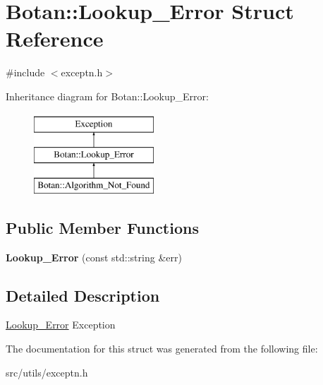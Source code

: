 \hypertarget{structBotan_1_1Lookup__Error}{\section{Botan\-:\-:Lookup\-\_\-\-Error Struct Reference}
\label{structBotan_1_1Lookup__Error}
}


{\ttfamily \#include $<$exceptn.\-h$>$}

Inheritance diagram for Botan\-:\-:Lookup\-\_\-\-Error\-:\begin{figure}[H]
\begin{center}
\leavevmode
\includegraphics[height=3.000000cm]{structBotan_1_1Lookup__Error}
\end{center}
\end{figure}
\subsection*{Public Member Functions}
\begin{DoxyCompactItemize}
\item 
\hypertarget{structBotan_1_1Lookup__Error_af5de9655a86c1592d6e06093e1749813}{{\bfseries Lookup\-\_\-\-Error} (const std\-::string \&err)}\label{structBotan_1_1Lookup__Error_af5de9655a86c1592d6e06093e1749813}

\end{DoxyCompactItemize}


\subsection{Detailed Description}
\hyperlink{structBotan_1_1Lookup__Error}{Lookup\-\_\-\-Error} Exception 

The documentation for this struct was generated from the following file\-:\begin{DoxyCompactItemize}
\item 
src/utils/exceptn.\-h\end{DoxyCompactItemize}
